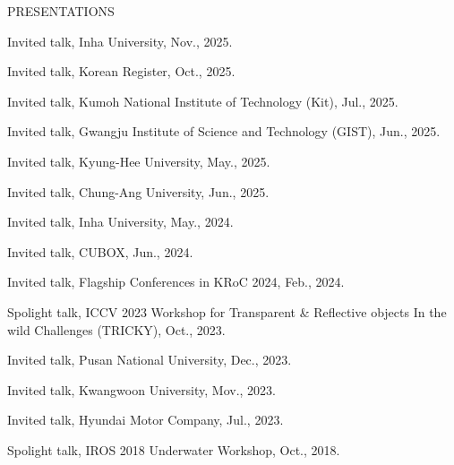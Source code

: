 \begin{rSection}{PRESENTATIONS}{}{}{}        
    \begin{rSubsection}{}{}{}{}
        \item Invited talk, Inha University, Nov., 2025.
        \item Invited talk, Korean Register, Oct., 2025.
        \item Invited talk, Kumoh National Institute of Technology (Kit), Jul., 2025.
        \item Invited talk, Gwangju Institute of Science and Technology (GIST), Jun., 2025.
        \item Invited talk, Kyung-Hee University, May., 2025.
        \item Invited talk, Chung-Ang University, Jun., 2025.
        \item Invited talk, Inha University, May., 2024.
        \item Invited talk, CUBOX, Jun., 2024.
        \item Invited talk, Flagship Conferences in KRoC 2024, Feb., 2024.
        \item Spolight talk, ICCV 2023 Workshop for Transparent \& Reflective objects In the wild Challenges (TRICKY), Oct., 2023.
        \item Invited talk, Pusan National University, Dec., 2023.
        \item Invited talk, Kwangwoon University, Mov., 2023.
        \item Invited talk, Hyundai Motor Company, Jul., 2023.
        \item Spolight talk, IROS 2018 Underwater Workshop, Oct., 2018.
     \end{rSubsection}         
 \end{rSection}

